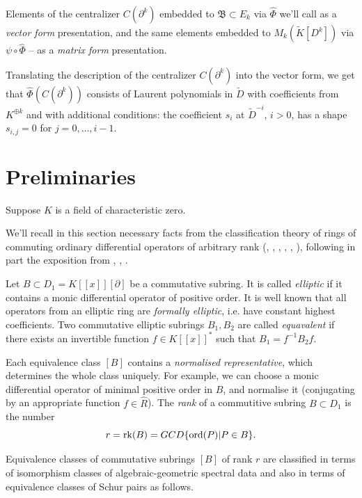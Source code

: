 \documentclass[11pt]{article}
\theoremstyle{definition}
\newcommand{\ord}{\mathop{\rm ord}\nolimits}
\newcommand{\rk}{\mathop {\rm rk}}
\theoremstyle{plain}
\numberwithin{equation}{section}
\begin{document}
Elements of the centralizer $C(\partial^k)$ embedded to $\mathfrak{B}\subset E_k$ via $\hat{\Phi}$ we'll call as a {\it vector form} presentation, and the same elements embedded to $M_k(\tilde{K}[D^k])$ via $\psi\circ \hat{\Phi}$ -- as a {\it matrix form} presentation. 

Translating the description of the centralizer $C(\partial^k)$  into the vector form, we get that $\hat{\Phi}(C(\partial^k))$ consists of Laurent polynomials in 
$\tilde{D}$ with coefficients from $K^{\oplus k}$ and with additional conditions: the coefficient $s_i$ at $\tilde{D}^{-i}$, $i>0$, has a shape $s_{i,j}=0$ for $j=0, \ldots , i-1$. 


\section{Preliminaries}
\label{S:prelim}

 

Suppose $K$ is a field of characteristic zero. 

We'll recall in this section necessary facts from the classification theory of rings of commuting ordinary differential operators of arbitrary rank (\cite{Kr1}, \cite{Kr2}, \cite{Dr}, \cite{Mumford_article}, \cite{SW}, \cite{Verdier}), following in part the exposition from \cite{Zheglov_book}, \cite{Mu}, \cite{Q}.  

Let $B\subset D_1=K[[x]][\partial ]$ be a commutative subring. It is called {\it elliptic} if it contains a monic differential operator of positive order. It is well known that all operators from an elliptic ring are {\it formally elliptic}, i.e. have constant highest coefficients. Two commutative elliptic subrings $B_1, B_2$  are called {\it equavalent} if there exists an invertible function $f\in K[[x]]^*$ such that 
$B_1=f^{-1}B_2f$. 

Each equivalence class $[B]$ contains a {\it normalised representative}, which determines the whole class uniquely. For example, we can choose a monic differential operator of minimal positive order in $B$, and normalise it (conjugating by an appropriate function $f\in \hat{R}$). The {\it rank} of a commutitive subring $B\subset D_1$ is the number
$$
r=\rk (B)=GCD\{\ord (P)|P\in B\}.
$$ 

Equivalence classes of commutative subrings $[B]$ of rank $r$ are classified in terms of isomorphism classes of algebraic-geometric spectral data and also in terms of equivalence classes of Schur pairs as follows. 
\end{document}
